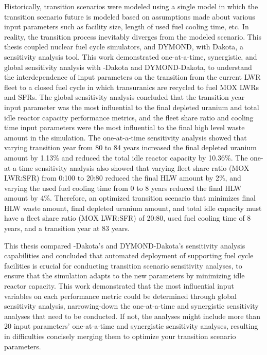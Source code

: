 Historically, transition scenarios were modeled 
using a single model in which the transition scenario future 
is modeled based on assumptions made about various input parameters 
such as facility size, length of used fuel cooling time, etc. 
In reality, the transition process inevitably diverges from the 
modeled scenario. 
This thesis coupled nuclear fuel cycle simulators, \Cyclus and 
DYMOND, with Dakota, a sensitivity analysis tool.
This work demonstrated one-at-a-time, synergistic, and 
global sensitivity analysis with \Cyclus-Dakota and DYMOND-Dakota,
to understand the interdependence of input parameters on the  
transition from the current 
LWR fleet to a closed fuel cycle in which transuranics are recycled to fuel 
MOX LWRs and SFRs. 
The global sensitivity analysis concluded that 
the transition year input parameter was the most influential
to the final depleted uranium and total idle reactor capacity 
performance metrics, and  
the fleet share ratio and cooling time input parameters 
were the most influential to the final high level waste amount in the 
simulation. 
The one-at-a-time sensitivity analysis showed that varying transition 
year from 80 to 84 years increased the final depleted uranium amount by 
1.13\% and reduced the total idle reactor capacity by 10.36\%. 
The one-at-a-time sensitivity analysis also showed that varying 
fleet share ratio (MOX LWR:SFR) from 0:100 to 20:80 reduced the 
final HLW amount by 2\%, and varying the used fuel cooling time from 0 to 
8 years reduced the final HLW amount by 4\%. 
Therefore, an optimized transition scenario that minimizes final 
HLW waste amount, final depleted uranium amount, and total idle capacity 
must have a fleet share ratio (MOX LWR:SFR) of 20:80, used fuel cooling time 
of 8 years, and a transition year at 83 years. 

This thesis compared \Cyclus-Dakota's and DYMOND-Dakota's sensitivity analysis 
capabilities 
and concluded that automated deployment of supporting fuel cycle 
facilities is crucial for conducting transition scenario sensitivity analyses, 
to ensure that the simulation 
adapts to the new parameters by minimizing idle reactor capacity.
This work demonstrated that the most influential input variables 
on each performance 
metric could be determined through global sensitivity 
analysis, narrowing-down the one-at-a-time and 
synergistic sensitivity analyses that need to be conducted.  
If not, the analyses might include more than 20 input parameters' 
one-at-a-time and synergistic sensitivity analyses, 
resulting in difficulties concisely merging them to optimize your 
transition scenario parameters.

